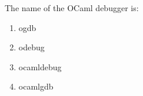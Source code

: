 \question The name of the OCaml debugger is:
\begin{enumerate}
\item ogdb
\item odebug
\item ocamldebug
\item ocamlgdb
\end{enumerate}